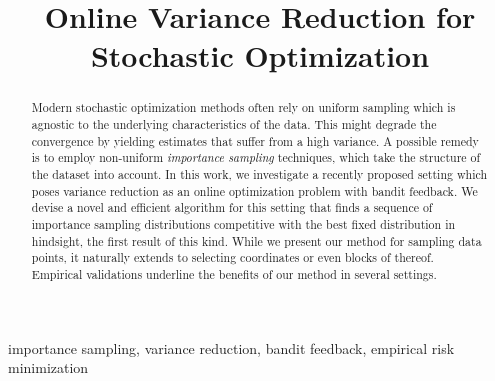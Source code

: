 \documentclass[final,12pt]{colt2018} %
\title[Online Variance Reduction for Stochastic Optimization]{Online Variance Reduction for Stochastic Optimization}
\begin{document}
\maketitle

\begin{abstract}
Modern stochastic optimization methods often rely on uniform sampling which is agnostic to the underlying characteristics of the data.
This might degrade the convergence by  yielding estimates that suffer from a high variance.  
A possible remedy is to employ non-uniform \emph{importance sampling} techniques, which take the structure of the dataset into account. 
In this work, we investigate a recently proposed  setting  which poses variance reduction as an online optimization problem with bandit feedback.
We devise a novel and efficient algorithm for this setting  that finds a sequence of importance sampling distributions competitive with the best fixed distribution in hindsight, the first result of this kind.
While we present our method for sampling data points, it naturally extends to selecting coordinates or even blocks of thereof.  Empirical validations underline the benefits of our method in several settings.
\end{abstract}

\begin{keywords}
importance sampling, variance reduction, bandit feedback, empirical risk minimization
\end{keywords}	





% 



\newpage


\end{document}
